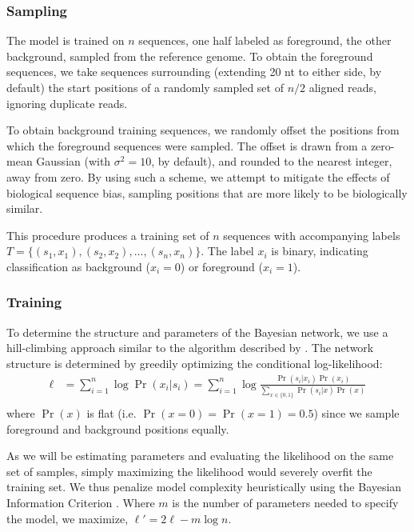 \documentclass{bioinfo}
\begin{document}
\subsubsection{Sampling}

The model is trained on $n$ sequences, one half labeled as foreground, the other
background, sampled from the reference genome. To obtain the foreground
sequences, we take sequences surrounding (extending 20 nt to either side, by
default) the start positions of a randomly sampled set of $n/2$ aligned reads,
ignoring duplicate reads.

To obtain background training sequences, we randomly offset the positions from
which the foreground sequences were sampled.  The offset is drawn from a
zero-mean Gaussian (with $\sigma^2 = 10$, by default), and rounded to the
nearest integer, away from zero.  By using such a scheme, we attempt to mitigate
the effects of biological sequence bias, sampling positions that are more likely
to be biologically similar.

This procedure produces a training set of $n$ sequences with accompanying labels
$T = \{ (s_1, x_1), (s_2, x_2), \dots, (s_n, x_n) \}$. The label $x_i$ is
binary, indicating classification as background ($x_i = 0$) or foreground ($x_i
= 1$).

\subsubsection{Training}


To determine the structure and parameters of the Bayesian network, we use a
hill-climbing approach similar to the algorithm described by \citet{Grossman2004}.
The network structure is determined by greedily optimizing the conditional
log-likelihood:
\begin{align*}
\ell &= \sum_{i=1}^{n} \log \Pr( x_i | s_i ) 
=
\sum_{i=1}^{n} \log \frac{ \Pr(s_i | x_i) \Pr( x_i ) }{
\sum_{x \in \{0,1\}} \Pr( s_i | x ) \Pr(x) } \\
\end{align*}
where $\Pr(x)$ is flat (i.e.  $\Pr( x = 0 ) = \Pr( x = 1 ) =
0.5$) since we sample foreground and background positions equally.

As we will be estimating parameters and evaluating the likelihood on the same
set of samples, simply maximizing the likelihood would severely overfit the
training set. We thus penalize model complexity heuristically using the Bayesian
Information Criterion \citep{Schwarz1978a}. Where $m$ is the number of
parameters needed to specify the model, we maximize, 
$ \ell' = 2 \ell - m \log n $.
\end{document}
